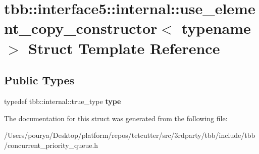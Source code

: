 \hypertarget{structtbb_1_1interface5_1_1internal_1_1use__element__copy__constructor}{}\section{tbb\+:\+:interface5\+:\+:internal\+:\+:use\+\_\+element\+\_\+copy\+\_\+constructor$<$ typename $>$ Struct Template Reference}
\label{structtbb_1_1interface5_1_1internal_1_1use__element__copy__constructor}
\subsection*{Public Types}
\begin{DoxyCompactItemize}
\item 
\hypertarget{structtbb_1_1interface5_1_1internal_1_1use__element__copy__constructor_a5913e8e0aade9ba672e6c9f9e72d4e1f}{}typedef tbb\+::internal\+::true\+\_\+type {\bfseries type}\label{structtbb_1_1interface5_1_1internal_1_1use__element__copy__constructor_a5913e8e0aade9ba672e6c9f9e72d4e1f}

\end{DoxyCompactItemize}


The documentation for this struct was generated from the following file\+:\begin{DoxyCompactItemize}
\item 
/\+Users/pourya/\+Desktop/platform/repos/tetcutter/src/3rdparty/tbb/include/tbb/concurrent\+\_\+priority\+\_\+queue.\+h\end{DoxyCompactItemize}
